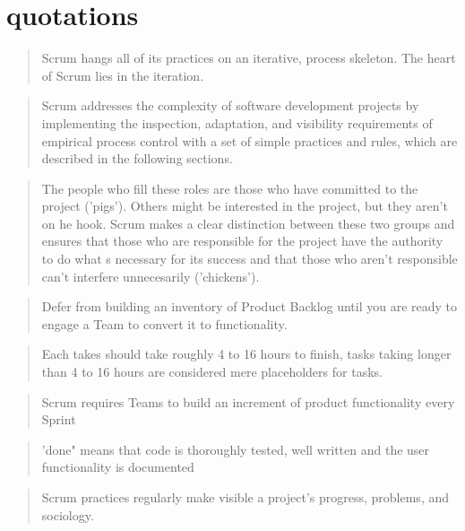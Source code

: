 \section*{quotations}


\begin{quotation}
  Scrum hangs all of its practices on an iterative,  process skeleton. The heart of Scrum lies in the iteration.
\end{quotation}


\begin{quotation}
  Scrum addresses the complexity of software development projects by implementing the inspection, adaptation, and visibility requirements of empirical process control with a set of simple practices and rules, which are described in the following sections. 
\end{quotation}


\begin{quotation}
  The people who fill these roles are those who have committed to the project ('pigs'). Others might be interested in the project, but they aren’t on  he hook. Scrum makes a clear distinction between these two groups and ensures that those who are responsible for the project have the authority to do what  s necessary for its success and that those who aren’t responsible can’t interfere unnecesarily ('chickens'). 
\end{quotation}


\begin{quotation}
  Defer from building an inventory of Product Backlog until you are ready to engage a Team to convert it to functionality.
\end{quotation}


\begin{quotation}
  Each takes should take roughly 4 to 16 hours to finish, tasks taking longer than 4 to 16 hours are considered mere placeholders for tasks.
\end{quotation}


\begin{quotation}
  Scrum requires Teams to build an increment of product functionality every Sprint
\end{quotation}

\begin{quotation}
  'done" means that code is thoroughly tested, well written and the user functionality is documented
\end{quotation}

\begin{quotation}
  Scrum practices regularly make visible a project’s progress, problems, and sociology.
\end{quotation}


